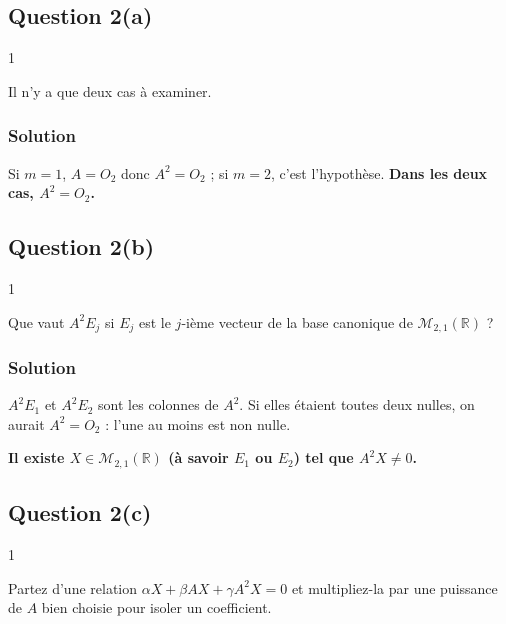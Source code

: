 \documentclass[11pt,a4paper]{article}
\begin{document}
\hypertarget{question-2a-1}{%
\subsection{Question 2(a)}\label{question-2a-1}}

\begin{indication}{1}

Il n'y a que deux cas à examiner.

\end{indication}

\hypertarget{solution-25}{%
\subsubsection{Solution}\label{solution-25}}

Si \(m=1\), \(A=O_2\) donc \(A^2=O_2\) ; si \(m=2\), c'est l'hypothèse. \textbf{Dans les deux cas, \(A^2=O_2\).}

\hypertarget{question-2b-1}{%
\subsection{Question 2(b)}\label{question-2b-1}}

\begin{indication}{1}

Que vaut \(A^2E_j\) si \(E_j\) est le \(j\)-ième vecteur de la base canonique de \(\mathcal M_{2,1}(\mathbb R)\) ?

\end{indication}

\hypertarget{solution-26}{%
\subsubsection{Solution}\label{solution-26}}

\(A^2E_1\) et \(A^2E_2\) sont les colonnes de \(A^2\). Si elles étaient toutes deux nulles, on aurait \(A^2=O_2\) : l'une au moins est non nulle.

\textbf{Il existe \(X\in\mathcal M_{2,1}(\mathbb R)\) (à savoir \(E_1\) ou \(E_2\)) tel que \(A^2X\neq0\).}

\hypertarget{question-2c-1}{%
\subsection{Question 2(c)}\label{question-2c-1}}

\begin{indication}{1}

Partez d'une relation \(\alpha X+\beta AX+\gamma A^2X=0\) et multipliez-la par une puissance de \(A\) bien choisie pour isoler un coefficient.

\end{indication}
\end{document}

